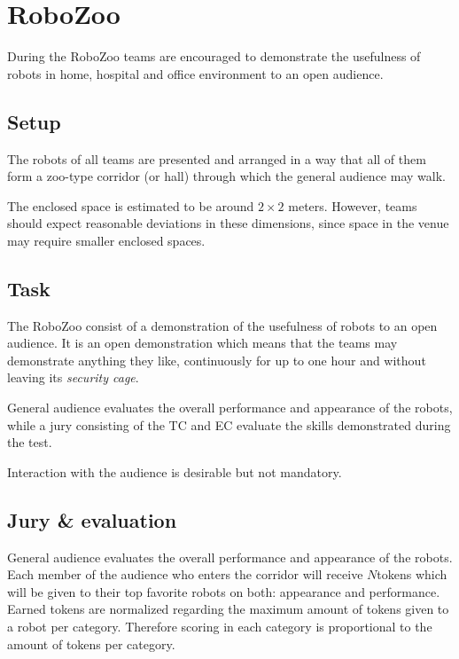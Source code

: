\newcommand{\roboZooTokens}{$N$}

\section{RoboZoo}
\label{sec:test_robo_zoo}

During the RoboZoo teams are encouraged to demonstrate the usefulness of robots in home, hospital and office environment to an open audience.

\subsection{Setup}
The robots of all teams are presented and arranged in a way that all of them form a zoo-type corridor (or hall) through which the general audience may walk.

The enclosed space is estimated to be around $2 \times 2$ meters. However, teams should expect reasonable deviations in these dimensions, since space in the venue may require smaller enclosed spaces.

\subsection{Task}
The RoboZoo consist of a demonstration of the usefulness of robots to an open audience. It is an open demonstration which means that the teams may demonstrate anything they like, continuously for up to one hour and without leaving its \textit{security cage}.

General audience evaluates the overall performance and appearance of the robots, while a jury consisting of the TC and EC evaluate the skills demonstrated during the test.

Interaction with the audience is desirable but not mandatory.

\subsection{Jury \& evaluation}
General audience evaluates the overall performance and appearance of the robots. Each member of the audience who enters the corridor will receive \roboZooTokens tokens which will be given to their top favorite robots on both: appearance and performance. Earned tokens are normalized regarding the maximum amount of tokens given to a robot per category. Therefore scoring in each category is proportional to the amount of tokens per category.

